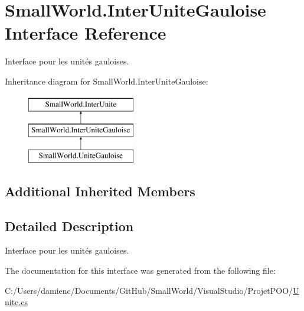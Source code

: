 \hypertarget{interface_small_world_1_1_inter_unite_gauloise}{\section{Small\-World.\-Inter\-Unite\-Gauloise Interface Reference}
\label{interface_small_world_1_1_inter_unite_gauloise}
}


Interface pour les unités gauloises.  


Inheritance diagram for Small\-World.\-Inter\-Unite\-Gauloise\-:\begin{figure}[H]
\begin{center}
\leavevmode
\includegraphics[height=3.000000cm]{interface_small_world_1_1_inter_unite_gauloise}
\end{center}
\end{figure}
\subsection*{Additional Inherited Members}


\subsection{Detailed Description}
Interface pour les unités gauloises. 

The documentation for this interface was generated from the following file\-:\begin{DoxyCompactItemize}
\item 
C\-:/\-Users/damienc/\-Documents/\-Git\-Hub/\-Small\-World/\-Visual\-Studio/\-Projet\-P\-O\-O/\hyperlink{_unite_8cs}{Unite.\-cs}\end{DoxyCompactItemize}
